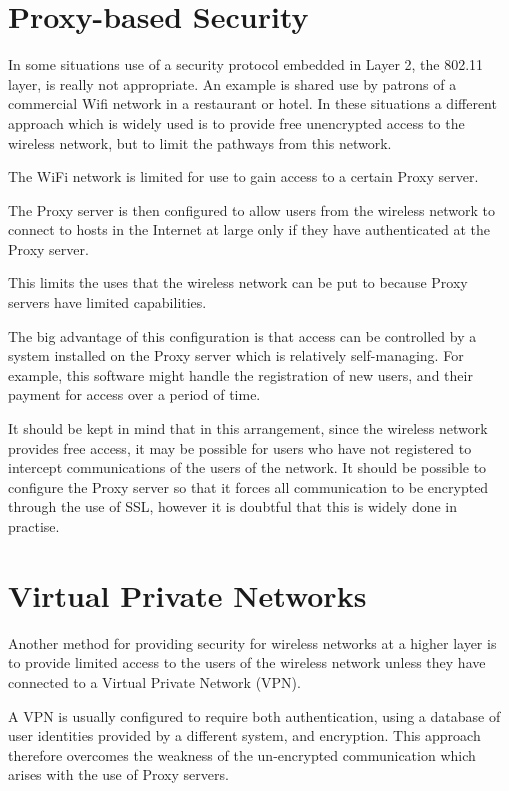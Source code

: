 \section{Proxy-based Security}

In some situations use of a security protocol embedded in Layer 2, the 802.11 layer, is really not appropriate. An example is shared use by patrons of a commercial Wifi network in a restaurant or hotel. In these situations a different approach which is widely used is to provide free unencrypted access to the wireless network, but to limit the pathways from this network.

The WiFi network is limited for use to gain access to a certain Proxy server.

The Proxy server is then configured to allow users from the wireless network to connect to hosts in the Internet at large only if they have authenticated at the Proxy server. 

This limits the uses that the wireless network can be put to because Proxy servers have limited capabilities.

The big advantage of this configuration is that access can be controlled by a system installed on the Proxy server which is relatively self-managing. For example, this software might handle the registration of new users, and their payment for access over a period of time.

It should be kept in mind that in this arrangement, since the wireless network provides free access, it may be possible for users who have not registered to intercept communications of the users of the network. It should be possible to configure the Proxy server so that it forces all communication to be encrypted through the use of SSL, however it is doubtful that this is widely done in practise.

\section{Virtual Private Networks}

Another method for providing security for wireless networks at a higher layer is to provide limited access to the users of the wireless network unless they have connected to a Virtual Private Network (VPN). 

A VPN is usually configured to require both authentication, using a database of user identities provided by a different system, and encryption. This approach therefore overcomes the weakness of the un-encrypted communication which arises with the
use of Proxy servers.

